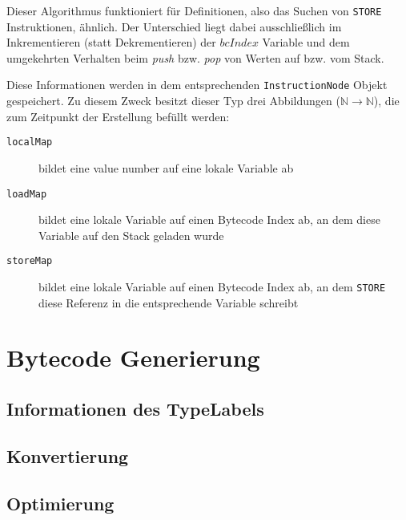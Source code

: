 Dieser Algorithmus funktioniert für Definitionen, also das Suchen von \texttt{STORE}
Instruktionen, ähnlich. Der Unterschied liegt dabei ausschließlich im Inkrementieren 
(statt Dekrementieren) der $bcIndex$ Variable und dem umgekehrten Verhalten beim 
\textit{push} bzw. \textit{pop} von Werten auf bzw. vom Stack.

Diese Informationen werden in dem entsprechenden \texttt{InstructionNode} Objekt
gespeichert. Zu diesem Zweck besitzt dieser Typ drei Abbildungen ($\mathbb{N} \rightarrow 
\mathbb{N}$), die zum Zeitpunkt der Erstellung befüllt werden:

\begin{description}
	\item [\texttt{localMap}] bildet eine value number auf eine lokale Variable ab
	\item [\texttt{loadMap}] bildet eine lokale Variable auf einen Bytecode Index ab, an 
	dem diese Variable auf den Stack geladen wurde
	\item [\texttt{storeMap}] bildet eine lokale Variable auf einen Bytecode Index ab, an
	dem \texttt{STORE} diese Referenz in die entsprechende Variable schreibt
\end{description} 

\section{Bytecode Generierung}

\subsection{Informationen des TypeLabels}
\label{ssec:infoLabel}

\subsection{Konvertierung}

\subsection{Optimierung}